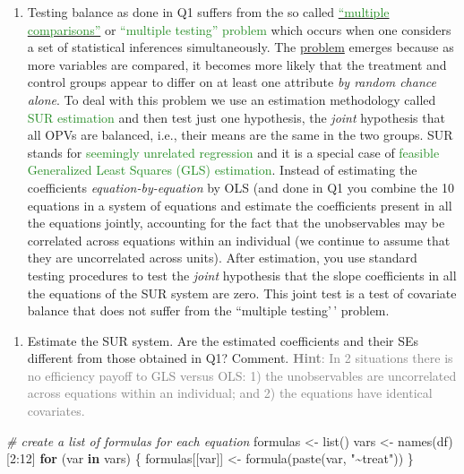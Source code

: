 \documentclass[
]{article}
\newenvironment{Shaded}{\begin{snugshade}}{\end{snugshade}}
\newcommand{\CommentTok}[1]{\textcolor[rgb]{0.56,0.35,0.01}{\textit{#1}}}
\newcommand{\ControlFlowTok}[1]{\textcolor[rgb]{0.13,0.29,0.53}{\textbf{#1}}}
\newcommand{\DecValTok}[1]{\textcolor[rgb]{0.00,0.00,0.81}{#1}}
\newcommand{\FunctionTok}[1]{\textcolor[rgb]{0.00,0.00,0.00}{#1}}
\newcommand{\NormalTok}[1]{#1}
\newcommand{\OtherTok}[1]{\textcolor[rgb]{0.56,0.35,0.01}{#1}}
\newcommand{\SpecialCharTok}[1]{\textcolor[rgb]{0.00,0.00,0.00}{#1}}
\newcommand{\StringTok}[1]{\textcolor[rgb]{0.31,0.60,0.02}{#1}}
\providecommand{\tightlist}{%
  \setlength{\itemsep}{0pt}\setlength{\parskip}{0pt}}
\begin{document}
\begin{enumerate}
\def\labelenumi{\arabic{enumi}.}
\setcounter{enumi}{1}
\tightlist
\item
  Testing balance as done in Q1 suffers from the so called
  \href{https://en.wikipedia.org/wiki/Multiple_comparisons_problem}{\textcolor{ForestGreen}{``multiple comparisons''}}
  or \textcolor{ForestGreen}{``multiple testing'' problem} which occurs
  when one considers a set of statistical inferences simultaneously. The
  \href{https://explainxkcd.com/wiki/index.php/882:_Significant}{problem}
  emerges because as more variables are compared, it becomes more likely
  that the treatment and control groups appear to differ on at least one
  attribute \textit{by random chance alone}. To deal with this problem
  we use an estimation methodology called
  \textcolor{ForestGreen}{SUR estimation} and then test just one
  hypothesis, the \textit{joint} hypothesis that all OPVs are balanced,
  i.e., their means are the same in the two groups. SUR stands for
  \textcolor{ForestGreen}{seemingly unrelated regression} and it is a
  special case of
  \textcolor{ForestGreen}{feasible Generalized Least Squares (GLS) estimation}.
  Instead of estimating the coefficients \textit{equation-by-equation}
  by OLS (and done in Q1 you combine the 10 equations in a system of
  equations and estimate the coefficients present in all the equations
  jointly, accounting for the fact that the unobservables may be
  correlated across equations within an individual (we continue to
  assume that they are uncorrelated across units). After estimation, you
  use standard testing procedures to test the \textit{joint} hypothesis
  that the slope coefficients in all the equations of the SUR system are
  zero. This joint test is a test of covariate balance that does not
  suffer from the ``multiple testing'\,' problem.
\end{enumerate}

\begin{enumerate}
\def\labelenumi{\alph{enumi}.}
\tightlist
\item
  Estimate the SUR system. Are the estimated coefficients and their SEs
  different from those obtained in Q1? Comment.
  \textcolor{gray}{\textbf{Hint}: In 2 situations there is no efficiency payoff to GLS versus OLS: 1) the unobservables are uncorrelated across equations within an individual; and 2) the equations have identical covariates.}
\end{enumerate}

\begin{Shaded}
\begin{Highlighting}[]
\CommentTok{\# create a list of formulas for each equation}
\NormalTok{formulas }\OtherTok{\textless{}{-}} \FunctionTok{list}\NormalTok{()}
\NormalTok{vars }\OtherTok{\textless{}{-}} \FunctionTok{names}\NormalTok{(df)[}\DecValTok{2}\SpecialCharTok{:}\DecValTok{12}\NormalTok{]}
\ControlFlowTok{for}\NormalTok{ (var }\ControlFlowTok{in}\NormalTok{ vars) \{}
\NormalTok{  formulas[[var]] }\OtherTok{\textless{}{-}} \FunctionTok{formula}\NormalTok{(}\FunctionTok{paste}\NormalTok{(var, }\StringTok{"\textasciitilde{}treat"}\NormalTok{))}
\NormalTok{\}}
\end{Highlighting}
\end{Shaded}
\end{document}
